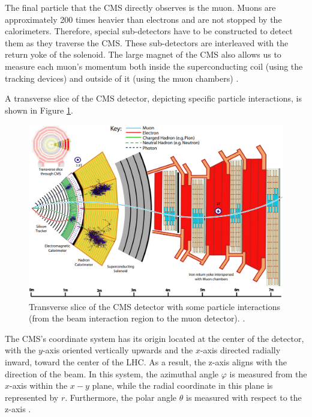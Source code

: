 The final particle that the CMS directly observes is the muon. Muons are approximately 200 times heavier than electrons and are not stopped by the calorimeters. Therefore, special sub-detectors have to be constructed to detect them as they traverse the CMS. These sub-detectors are interleaved with the return yoke of the solenoid. The large magnet of the CMS also allows us to measure each muon's momentum both inside the superconducting coil (using the tracking devices) and outside of it (using the muon chambers) \cite{det_summary}. 

A transverse slice of the CMS detector, depicting specific particle interactions, is shown in Figure \ref{slice_CMS}.


\begin{center}
  \begin{figure}[ht]
    \centering
    \includegraphics[scale=.3]{Chapter2/slice_det.png}
    \caption[Transverse slice fo CMS detector]{Transverse slice of the CMS detector with some particle interactions (from the beam interaction region to the muon detector).  \cite{det_summary}.}
    \label{slice_CMS}
  \end{figure}
\end{center}

The CMS's coordinate system has its origin located at the center of the detector, with the $y$-axis oriented vertically upwards and the $x$-axis directed radially inward, toward the center of the LHC. As a result, the z-axis aligns with the direction of the beam. In this system, the azimuthal angle $\varphi$ is measured from the $x$-axis within the $x-y$ plane, while the radial coordinate in this plane is represented by $r$. Furthermore, the polar angle $\theta$ is measured with respect to the z-axis \cite{CMS_Exp_2008}.

